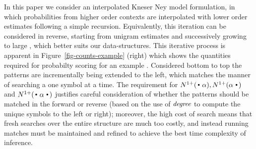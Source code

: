 In this paper we consider an interpolated Kneser Ney model formulation, in which
probabilities from higher order contexts are interpolated with lower
order estimates following a simple recursion. 
Equivalently, this iteration can be considered in reverse, starting from unigram
estimates and successively growing to large \ngrams, which better
suits our \CST data-structures.
This iterative process is apparent in Figure~\ref{fig-counts-example} (right) which
shows the quantities required for probabilty scoring for an example \ngram.
Considered bottom to top the patterns are incrementally being extended
to the left, which matches the manner of searching a \CST one symbol at a time.  
The requirement for $\nlplus{\dotpat}, \nlplus{\patdot}$ and
$\nlplus{\dotpatdot}$ justifies careful consideration of whether the
patterns should be matched in the forward or reverse \CST (based on the use 
of $\emph{degree}$ to compute the unique symbols to the left or right); moreover,
the high cost of search means that fresh searches over the entire
structure are much too costly, and instead running matches must be
maintained and refined to achieve the best time complexity of inference. 

